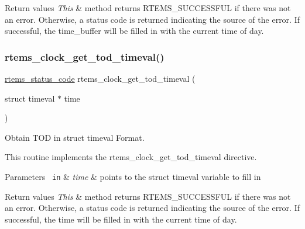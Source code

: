 \begin{DoxyRetVals}{Return values}
{\em This} & method returns R\+T\+E\+M\+S\+\_\+\+S\+U\+C\+C\+E\+S\+S\+F\+UL if there was not an error. Otherwise, a status code is returned indicating the source of the error. If successful, the time\+\_\+buffer will be filled in with the current time of day. \\
\hline
\end{DoxyRetVals}
\mbox{\label{group__ClassicClock_ga4c42801d9c3b97560a4d83b12c34c54a}} 
\subsubsection{\texorpdfstring{rtems\_clock\_get\_tod\_timeval()}{rtems\_clock\_get\_tod\_timeval()}}
{\footnotesize\ttfamily \mbox{\hyperlink{group__ClassicStatus_ga545d41846817eaba6143d52ee4d9e9fe}{rtems\+\_\+status\+\_\+code}} rtems\+\_\+clock\+\_\+get\+\_\+tod\+\_\+timeval (\begin{DoxyParamCaption}\item[{struct timeval $\ast$}]{time }\end{DoxyParamCaption})}



Obtain T\+OD in struct timeval Format. 

This routine implements the rtems\+\_\+clock\+\_\+get\+\_\+tod\+\_\+timeval directive.


\begin{DoxyParams}[1]{Parameters}
\mbox{\texttt{ in}}  & {\em time} & points to the struct timeval variable to fill in\\
\hline
\end{DoxyParams}

\begin{DoxyRetVals}{Return values}
{\em This} & method returns R\+T\+E\+M\+S\+\_\+\+S\+U\+C\+C\+E\+S\+S\+F\+UL if there was not an error. Otherwise, a status code is returned indicating the source of the error. If successful, the time will be filled in with the current time of day. \\
\hline
\end{DoxyRetVals}
\mbox{\label{group__ClassicClock_ga634e38a96a2ba53cc7f7c99f263ffdff}} 
